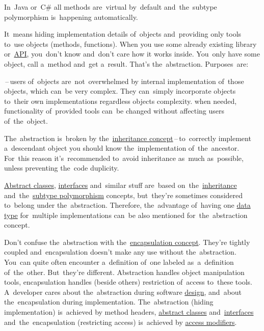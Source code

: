 \warning In~Java or~C\# all methods are~virtual by~default and~the~subtype polymorphism is~happening automatically.

\label{abstraction}
It~means hiding implementation details of~objects and~providing only tools to~use objects (methods, functions).
When you use some already existing library or~\hyperref[api]{API}, you~don't know and~don't care how it works inside.
You~only have some object, call a~method and~get a~result.
That's the~abstraction.
Purposes~are:
\begin{itemize}
    \,--\,users of~objects are~not~overwhelmed by internal implementation of~those objects, which can~be very complex.
            They can~simply incorporate objects to~their own implementations regardless objects complexity.
     when needed, functionality of~provided tools can~be changed without affecting users of~the~object.
\end{itemize}

\warning The~abstraction is~broken by the~\hyperref[inheritance]{inheritance concept}\,--\,to~correctly implement a~descendant object you should know the~implementation of~the~ancestor.
For~this reason it's~recommended to~avoid inheritance as~much as~possible, unless preventing the~code duplicity.

\warning \hyperref[javaabstractclasses]{Abstract classes}, \hyperref[javainterfaces]{interfaces} and~similar stuff are~based on~the~\hyperref[inheritance]{inheritance} and~the~\hyperref[polymorphism]{subtype polymorphism} concepts, but~they're sometimes considered to~belong under the~abstraction.
Therefore, the~advantage of~having one \hyperref[datatypes]{data type} for~multiple implementations can~be also mentioned for~the~abstraction concept.

\warning Don't confuse the~abstraction with the~\hyperref[encapsulation]{encapsulation concept}.
They're tightly coupled and~encapsulation doesn't make any use without the~abstraction.
You~can quite often encounter a~definition of~one labeled as~a~definition of~the~other.
But~they're different.
Abstraction handles object manipulation tools, encapsulation handles (beside others) restriction of~access to~these tools.
A~developer cares about the~abstraction during software \hyperref[architecturedesign]{design}, and~about the~encapsulation during implementation.
The~abstraction (hiding implementation) is~achieved by method headers, \hyperref[javaabstractclasses]{abstract classes} and~\hyperref[javainterfaces]{interfaces} and~the~encapsulation (restricting access) is~achieved by \hyperref[javaaccessmodifiers]{access modifiers}.

